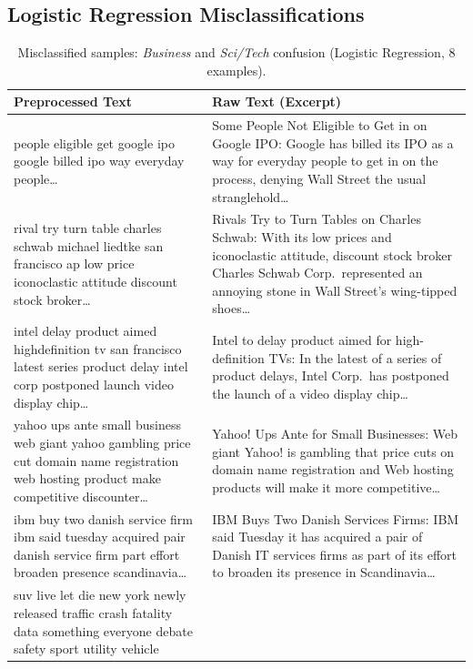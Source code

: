 \newpage

\subsection*{Logistic Regression Misclassifications}

\begin{table}[htbp]
\centering
\caption{Misclassified samples: \textit{Business} and \textit{Sci/Tech} confusion (Logistic Regression, 8 examples).}
\label{tab:logreg-biz-scitech}
\small
\begin{tabular}{p{0.6\textheight} p{0.6\textheight}}
\toprule
\textbf{Preprocessed Text} & \textbf{Raw Text (Excerpt)} \\
\midrule
people eligible get google ipo google billed ipo way everyday people\ldots &
Some People Not Eligible to Get in on Google IPO: Google has billed its IPO as a way for everyday people to get in on the process, denying Wall Street the usual stranglehold\ldots \\
\addlinespace
rival try turn table charles schwab michael liedtke san francisco ap low price iconoclastic attitude discount stock broker\ldots &
Rivals Try to Turn Tables on Charles Schwab: With its low prices and iconoclastic attitude, discount stock broker Charles Schwab Corp.\ represented an annoying stone in Wall Street's wing-tipped shoes\ldots \\
\addlinespace
intel delay product aimed highdefinition tv san francisco latest series product delay intel corp postponed launch video display chip\ldots &
Intel to delay product aimed for high-definition TVs: In the latest of a series of product delays, Intel Corp.\ has postponed the launch of a video display chip\ldots \\
\addlinespace
yahoo ups ante small business web giant yahoo gambling price cut domain name registration web hosting product make competitive discounter\ldots &
Yahoo! Ups Ante for Small Businesses: Web giant Yahoo! is gambling that price cuts on domain name registration and Web hosting products will make it more competitive\ldots \\
\addlinespace
ibm buy two danish service firm ibm said tuesday acquired pair danish service firm part effort broaden presence scandinavia\ldots &
IBM Buys Two Danish Services Firms: IBM said Tuesday it has acquired a pair of Danish IT services firms as part of its effort to broaden its presence in Scandinavia\ldots \\
\addlinespace
suv live let die new york newly released traffic crash fatality data something everyone debate safety sport utility vehicle &

\end{tabular}
\end{table}
